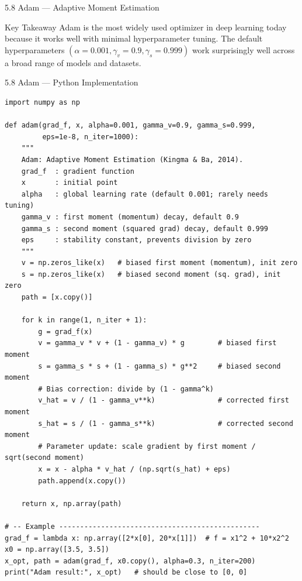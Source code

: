 \documentclass[aspectratio=169,10pt]{beamer}
\begin{document}
\begin{frame}[allowframebreaks]{5.8 Adam --- Adaptive Moment Estimation}
  \begin{alertblock}{Key Takeaway}
    Adam is the most widely used optimizer in deep learning
    today because it works well with minimal hyperparameter
    tuning.  The default hyperparameters $(\alpha=0.001,
    \gamma_v=0.9, \gamma_s=0.999)$ work surprisingly well
    across a broad range of models and datasets.
  \end{alertblock}

\end{frame}

\begin{frame}[fragile]{5.8 Adam --- Python Implementation}
\begin{lstlisting}[caption={Adam Optimizer (Python/NumPy)}]
import numpy as np

def adam(grad_f, x, alpha=0.001, gamma_v=0.9, gamma_s=0.999,
         eps=1e-8, n_iter=1000):
    """
    Adam: Adaptive Moment Estimation (Kingma & Ba, 2014).
    grad_f  : gradient function
    x       : initial point
    alpha   : global learning rate (default 0.001; rarely needs tuning)
    gamma_v : first moment (momentum) decay, default 0.9
    gamma_s : second moment (squared grad) decay, default 0.999
    eps     : stability constant, prevents division by zero
    """
    v = np.zeros_like(x)   # biased first moment (momentum), init zero
    s = np.zeros_like(x)   # biased second moment (sq. grad), init zero
    path = [x.copy()]

    for k in range(1, n_iter + 1):
        g = grad_f(x)
        v = gamma_v * v + (1 - gamma_v) * g        # biased first moment
        s = gamma_s * s + (1 - gamma_s) * g**2     # biased second moment
        # Bias correction: divide by (1 - gamma^k)
        v_hat = v / (1 - gamma_v**k)               # corrected first moment
        s_hat = s / (1 - gamma_s**k)               # corrected second moment
        # Parameter update: scale gradient by first moment / sqrt(second moment)
        x = x - alpha * v_hat / (np.sqrt(s_hat) + eps)
        path.append(x.copy())

    return x, np.array(path)

# -- Example ------------------------------------------------
grad_f = lambda x: np.array([2*x[0], 20*x[1]])  # f = x1^2 + 10*x2^2
x0 = np.array([3.5, 3.5])
x_opt, path = adam(grad_f, x0.copy(), alpha=0.3, n_iter=200)
print("Adam result:", x_opt)   # should be close to [0, 0]
\end{lstlisting}
\end{frame}
\end{document}

